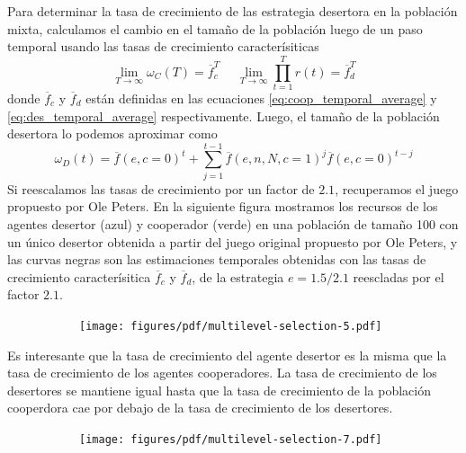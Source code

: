 \documentclass[a4paper,10pt]{article}
\begin{document}
{%

Para determinar la tasa de crecimiento de las estrategia desertora en la población mixta, calculamos el cambio en el tamaño de la población luego de un paso temporal usando las tasas de crecimiento caracterísiticas 
\begin{equation}
\lim_{T \rightarrow \infty} \omega_C(T) = \overline{f}_c^T \ \ \ \  \ \ \lim_{T \rightarrow \infty} \prod^T_{t=1} r(t) = \overline{f}_d^T
\end{equation}
donde $\overline{f}_c$ y $\overline{f}_d$ están definidas en las ecuaciones \ref{eq:coop_temporal_average} y \ref{eq:des_temporal_average} respectivamente.
Luego, el tamaño de la población desertora lo podemos aproximar como 
\begin{equation}
\omega_D(t) = \overline{f}(e,c=0)^t + \sum^{t-1}_{j=1} \overline{f}(e,n,N,c=1)^j \overline{f}(e,c=0)^{t-j}
\end{equation}
Si reescalamos las tasas de crecimiento por un factor de $2.1$, recuperamos el juego propuesto por Ole Peters.
En la siguiente figura mostramos los recursos de los agentes desertor (azul) y cooperador (verde) en una población de tamaño 100 con un único desertor obtenida a partir del juego original propuesto por Ole Peters, y las curvas negras son las estimaciones temporales obtenidas con las tasas de crecimiento caracterísitica $\overline{f}_c$ y $\overline{f}_d$, de la estrategia $e=1.5/2.1$ reescladas por el factor $2.1$.
\begin{figure}[H]
    \centering
    \begin{subfigure}[b]{0.66\textwidth}
    \texttt{[image: figures/pdf/multilevel-selection-5.pdf]}
    \end{subfigure}
    \caption{
    }
    \label{fig:multilevel-selection-5}
\end{figure}
Es interesante que la tasa de crecimiento del agente desertor es la misma que la tasa de crecimiento de los agentes cooperadores.
La tasa de crecimiento de los desertores se mantiene igual hasta que la tasa de crecimiento de la población cooperdora cae por debajo de la tasa de crecimiento de los desertores.
%
\begin{figure}[H]
    \centering
    \begin{subfigure}[b]{0.66\textwidth}
    \texttt{[image: figures/pdf/multilevel-selection-7.pdf]}
    \end{subfigure}
    \caption{
    }
    \label{fig:multilevel-selection-7}
\end{figure}
%

}
\end{document}
